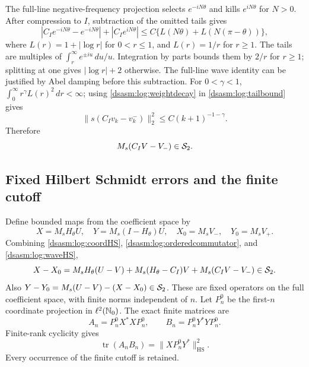 \documentclass[11pt,letterpaper]{article}
\theoremstyle{remark}\newtheorem{remark}[theorem]{Remark}
\newcommand{\HS}{\mathrm{HS}}
\DeclareMathOperator{\tr}{tr}\DeclareMathOperator{\Ran}{Ran}
\begin{document}
The full-line negative-frequency projection selects
$e^{-iN\theta}$ and kills $e^{iN\theta}$ for $N>0$.
After compression to $I$, subtraction of the omitted tails gives
\begin{equation}\label{dsasm:log:tailbound}
 |C_Ie^{-iN\theta}-e^{-iN\theta}|+|C_Ie^{iN\theta}|
 \le C\{L(N\theta)+L(N(\pi-\theta))\},
\end{equation}
where $L(r)=1+|\log r|$ for $0<r\le1$, and $L(r)=1/r$ for $r\ge1$.
The tails are multiples of $\int_r^\infty e^{\pm iu}\,du/u$.
Integration by parts bounds them by $2/r$ for $r\ge1$; splitting
at one gives $|\log r|+2$ otherwise. The full-line wave identity
can be justified by Abel damping before this subtraction.
For $0<\gamma<1$, $\int_0^\infty r^\gamma L(r)^2\,dr<\infty$;
using \eqref{dsasm:log:weightdecay} in \eqref{dsasm:log:tailbound} gives
\[
 \|s(C_Iv_k-v_k^-)\|_2^2\le C(k+1)^{-1-\gamma}.
\]
Therefore
\begin{equation}\label{dsasm:log:waveHS}
 M_s(C_IV-V_-)\in\mathcal S_2.
\end{equation}

\subsection{Fixed Hilbert Schmidt errors and the finite cutoff}
Define bounded maps from the coefficient space by
\[
 X=M_sH_\theta U,\quad Y=M_s(I-H_\theta)U,\quad
 X_0=M_sV_-,\quad Y_0=M_sV_+.
\]
Combining \eqref{dsasm:log:coordHS}, \eqref{dsasm:log:orderedcommutator}, and
\eqref{dsasm:log:waveHS},
\[
 X-X_0=M_sH_\theta(U-V)+M_s(H_\theta-C_I)V
                           +M_s(C_IV-V_-)\in\mathcal S_2.
\]
Also $Y-Y_0=M_s(U-V)-(X-X_0)\in\mathcal S_2$.
These are fixed operators on the full coefficient space, with finite
norms independent of $n$. Let $P_n^0$ be the first-$n$ coordinate
projection in $\ell^2(\mathbb N_0)$. The exact finite matrices are
\[
 A_n=P_n^0X^*XP_n^0,\qquad B_n=P_n^0Y^*YP_n^0.
\]
Finite-rank cyclicity gives
\begin{equation}\label{dsasm:log:overlapidentity}
 \tr(A_nB_n)=\|XP_n^0Y^*\|_\HS^2.
\end{equation}
Every occurrence of the finite cutoff is retained.
\end{document}
